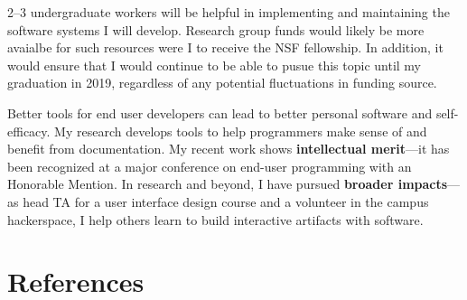 \documentclass[12pt]{memoir}
\begin{document}
2--3 undergraduate workers will be helpful in implementing and maintaining the software systems I will develop.
Research group funds would likely be more avaialbe for such resources were I to receive the NSF fellowship.
In addition, it would ensure that I would continue to be able to pusue this topic until my graduation in 2019, regardless of any potential fluctuations in funding source.

Better tools for end user developers can lead to better personal software and self-efficacy.
My research develops tools to help programmers make sense of and benefit from documentation.
My recent work shows \textbf{intellectual merit}---it has been recognized at a major conference on end-user programming with an Honorable Mention.
In research and beyond, I have pursued \textbf{broader impacts}---as head TA for a user interface design course and a volunteer in the campus hackerspace, I help others learn to build interactive artifacts with software.
\fi


\section{References}
\printbibliography[heading=none]
\end{document}
